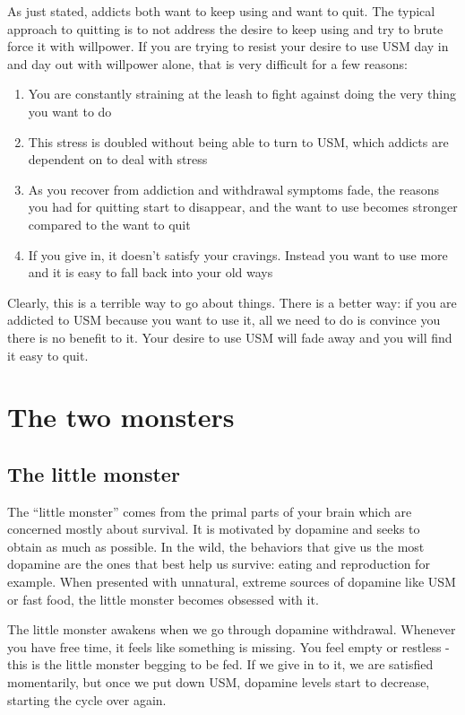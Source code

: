 \documentclass[
]{book}
\providecommand{\tightlist}{%
  \setlength{\itemsep}{0pt}\setlength{\parskip}{0pt}}
\begin{document}
As just stated, addicts both want to keep using and want to quit. The typical approach to quitting is to not address the desire to keep using and try to brute force it with willpower. If you are trying to resist your desire to use USM day in and day out with willpower alone, that is very difficult for a few reasons:

\begin{enumerate}
\def\labelenumi{\arabic{enumi}.}
\tightlist
\item
  You are constantly straining at the leash to fight against doing the very thing you want to do
\item
  This stress is doubled without being able to turn to USM, which addicts are dependent on to deal with stress
\item
  As you recover from addiction and withdrawal symptoms fade, the reasons you had for quitting start to disappear, and the want to use becomes stronger compared to the want to quit
\item
  If you give in, it doesn't satisfy your cravings. Instead you want to use more and it is easy to fall back into your old ways
\end{enumerate}

Clearly, this is a terrible way to go about things. There is a better way: if you are addicted to USM because you want to use it, all we need to do is convince you there is no benefit to it. Your desire to use USM will fade away and you will find it easy to quit.

\chapter{The two monsters}\label{why-hard}

\section{The little monster}\label{the-little-monster}

The ``little monster'' comes from the primal parts of your brain which are concerned mostly about survival. It is motivated by dopamine and seeks to obtain as much as possible. In the wild, the behaviors that give us the most dopamine are the ones that best help us survive: eating and reproduction for example. When presented with unnatural, extreme sources of dopamine like USM or fast food, the little monster becomes obsessed with it.

The little monster awakens when we go through dopamine withdrawal. Whenever you have free time, it feels like something is missing. You feel empty or restless - this is the little monster begging to be fed. If we give in to it, we are satisfied momentarily, but once we put down USM, dopamine levels start to decrease, starting the cycle over again.
\end{document}
